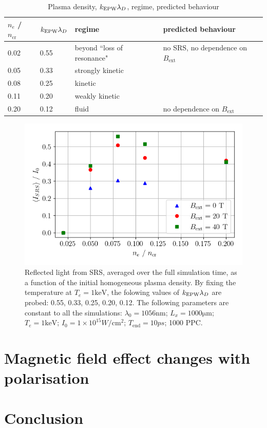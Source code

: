 \begin{table}[h]
\begin{center}

\begin{tabular}{|l|l|l|l|}
\hline
$n_e$ / $n_{\mathrm{cr}}$ & $k_\mathrm{EPW}\lambda_D$ & regime & predicted behaviour\\ \hline \hline
0.02 & 0.55 & beyond ``loss of resonance" & no SRS, no dependence on $B_{\mathrm{ext}}$  \\ \hline
0.05 & 0.33 & strongly kinetic &  \\ \hline
0.08 & 0.25 & kinetic &  \\ \hline
0.11 & 0.20 & weakly kinetic & \\ \hline
0.20 & 0.12 & fluid & no dependence on $B_{\mathrm{ext}}$\\ \hline

\end{tabular}

\end{center}
\caption{Plasma density, $k_\mathrm{EPW}\lambda_D$, regime, predicted behaviour}
\label{tab:predictions}
\end{table}

\begin{figure}[ht]
   \centering
    \includegraphics[width=0.9\columnwidth]{Chapters/C6_magSRS/kld_scan_SRS_scaling.png}
    \caption{Reflected light from SRS, averaged over the full simulation time, as a function of the initial homogeneous plasma density. By fixing the temperature at $T_e = 1\si{\kilo\electronvolt}$, the folowing values of $k_\mathrm{EPW}\lambda_D$ are probed: 0.55, 0.33, 0.25, 0.20, 0.12. The following parameters are constant to all the simulations: 
 $\lambda_0 = 1056 \si{\nano\metre}$; $L_x = 1000 \si{\micro\metre}$; $T_e = 1 \si{\kilo\electronvolt}$; $I_0 = 1\times 10^{15}\si{W/\cm^2}$; $T_{\mathrm{end}}=10 \si{ps}$; 1000 PPC.}
    \label{fig:SRS_EPOCH}
\end{figure}{}


\section{Magnetic field effect changes with polarisation}

\section{Conclusion}



